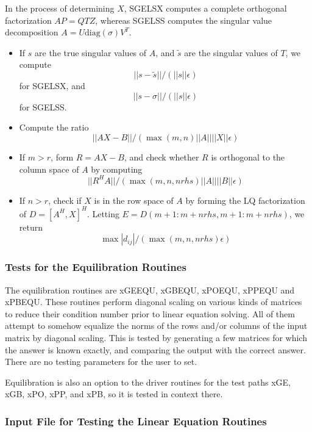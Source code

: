 In the process of determining $X$, SGELSX computes a
complete orthogonal factorization $AP = QTZ$,
whereas SGELSS computes the singular value decomposition $A = U
\mbox{diag}(\sigma) V^T$.

\begin{itemize}

\item If $s$ are the true singular values of $A$, and $\tilde{s}$ are
the
singular values of $T$, we compute
        $$||s - \tilde{s}||/(||s||\epsilon)$$
for SGELSX, and
        $$||s - \sigma ||/(||s||\epsilon)$$
for SGELSS.

\item Compute the ratio
$$||AX - B||/(\max(m,n) ||A|| ||X|| \epsilon)$$

\item If $m > r$, form
$R = AX - B$, and check whether
$R$ is orthogonal to the column space of $A$ by computing
        $$|| R^H A ||/(\max(m,n,nrhs)||A|| ||B|| \epsilon)$$

\item  If $n > r$, check if $X$ is in the row space of $A$ by forming
the LQ factorization of
$D = [A^H,X]^H$.
Letting
$E = D(m+1:m+nrhs,m+1:m+nrhs)$, we return
        $$\max |d_{ij}| / (\max(m,n,nrhs) \epsilon) $$

\end{itemize}

\subsubsection{Tests for the Equilibration Routines}

\dent
The equilibration routines are xGEEQU, xGBEQU, xPOEQU, xPPEQU and
xPBEQU. These routines perform diagonal scaling on various kinds of
matrices to reduce their condition number prior to linear equation
solving. All of them attempt to somehow equalize the norms of the
rows and/or columns of the input matrix by diagonal scaling. This
is tested by generating a few matrices for which the answer is
known exactly, and comparing the output with the correct answer.
There are no testing parameters for the user to set.

Equilibration is also an option to the driver routines for the test
paths xGE, xGB, xPO, xPP, and xPB, so it is tested in context there.

\subsubsection{Input File for Testing the Linear Equation Routines}

